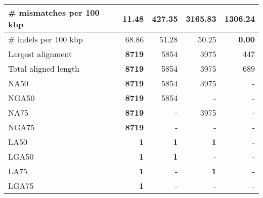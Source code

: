 \documentclass[12pt,a4paper]{article}
\begin{document}
\begin{table}[ht]
\begin{center}
\begin{tabular}{|l*{4}{|r}|}
\# mismatches per 100 kbp & {\bf 11.48} & 427.35 & 3165.83 & 1306.24 \\ \hline
\# indels per 100 kbp & 68.86 & 51.28 & 50.25 & {\bf 0.00} \\ \hline
Largest alignment & {\bf 8719} & 5854 & 3975 & 447 \\ \hline
Total aligned length & {\bf 8719} & 5854 & 3975 & 689 \\ \hline
NA50 & {\bf 8719} & 5854 & 3975 & - \\ \hline
NGA50 & {\bf 8719} & 5854 & - & - \\ \hline
NA75 & {\bf 8719} & - & 3975 & - \\ \hline
NGA75 & {\bf 8719} & - & - & - \\ \hline
LA50 & {\bf 1} & {\bf 1} & {\bf 1} & - \\ \hline
LGA50 & {\bf 1} & {\bf 1} & - & - \\ \hline
LA75 & {\bf 1} & - & {\bf 1} & - \\ \hline
LGA75 & {\bf 1} & - & - & - \\ \hline
\end{tabular}
\end{center}
\end{table}
\end{document}
